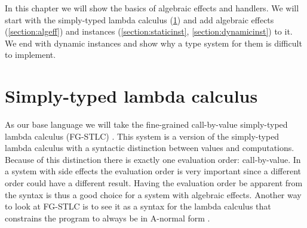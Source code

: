 {
\newcommand\eff[0]{\epsilon}

\newcommand\ty[0]{\tau}
\newcommand\tunit[0]{()}
\newcommand\tarr[2]{#1 \rightarrow #2}
\newcommand\thandler[2]{#1 \Rightarrow #2}
\newcommand\tforall[3]{\forall(#1:#2) . #3}

\newcommand\cty[0]{\underline{\ty}}
\newcommand\aty[2]{#1 \; ! \; #2}
\newcommand\texists[3]{\exists(#1:#2) . #3}
\newcommand\texistss[2]{\exists \overrightarrow{#1} . #2}

\newcommand\val[0]{\nu}
\newcommand\vunit[0]{()}
\newcommand\vinst[1]{\mathsf{inst}(#1)}
\newcommand\vabst[3]{\Lambda(#1:#2) . #3}
\newcommand\vabs[2]{\lambda #1 . #2}
\newcommand\vappt[2]{#1 \; [ #2 ]}

\newcommand\comp[0]{c}
\newcommand\creturn[1]{\mathsf{return} \; #1}
\newcommand\capp[2]{#1 \; #2}
\newcommand\cdo[3]{#1 \leftarrow #2 ; #3}
\newcommand\cop[2]{#1(#2)}
\newcommand\copi[5]{#1 \# #2(#3 ; #4 . #5)}
\newcommand\chandle[2]{\mathsf{handle} (#1) \{ #2 \}}
\newcommand\cnew[1]{\mathsf{new} \; #1}
\newcommand\cunpack[4]{(#1, #2) \leftarrow #3 ; #4}

\newcommand\hop[5]{#1 \; #2 \; #3 \rightarrow #4 ; \; #5}
\newcommand\hreturn[2]{\mathsf{return}\; #1 \rightarrow #2}
\newcommand\hopc[4]{#1 \; #2 \; #3 \rightarrow #4}

In this chapter we will show the basics of algebraic effects and handlers. We will start with the simply-typed lambda calculus (\cref{section:stlc}) and add algebraic effects (\cref{section:algeff}) and instances (\cref{section:staticinst}, \cref{section:dynamicinst}) to it. We end with dynamic instances and show why a type system for them is difficult to implement.

\section{Simply-typed lambda calculus} \label{section:stlc}

As our base language we will take the fine-grained call-by-value simply-typed lambda calculus (FG-STLC) \cite{fg-stlc}.
This system is a version of the simply-typed lambda calculus with a syntactic distinction between values and computations.
Because of this distinction there is exactly one evaluation order: call-by-value.
In a system with side effects the evaluation order is very important since a different order could have a different result.
Having the evaluation order be apparent from the syntax is thus a good choice for a system with algebraic effects.
Another way to look at FG-STLC is to see it as a syntax for the lambda calculus that constrains the program to always be in A-normal form \cite{anormalform}.

}
